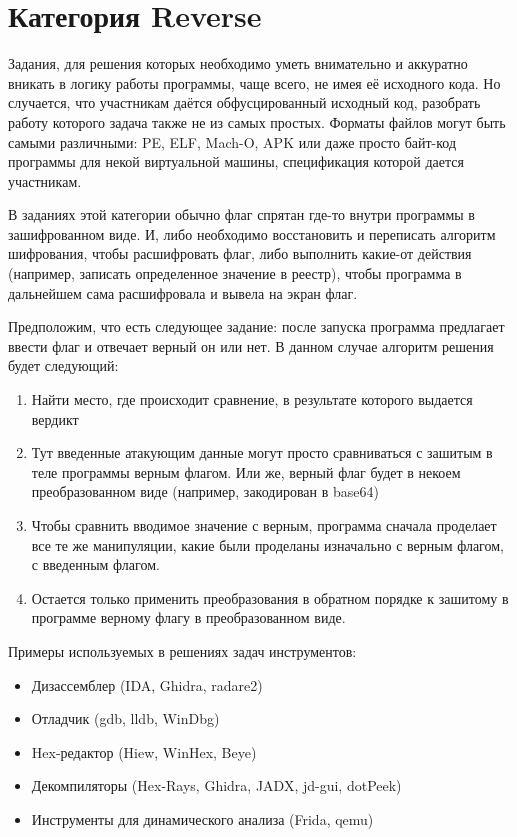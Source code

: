 


\section{Категория Reverse}

Задания, для решения которых необходимо уметь внимательно и аккуратно вникать в логику работы программы, чаще всего, не имея её исходного кода. Но случается, что участникам даётся обфусцированный исходный код, разобрать работу которого задача также не из самых простых. Форматы файлов могут быть самыми различными: PE, ELF, Mach-O, APK или даже просто байт-код программы для некой виртуальной машины, спецификация которой дается участникам.

В заданиях этой категории обычно флаг спрятан где-то внутри программы в зашифрованном виде. И, либо необходимо восстановить и переписать алгоритм шифрования, чтобы расшифровать флаг, либо выполнить какие-от действия (например, записать определенное значение в реестр), чтобы программа в дальнейшем сама расшифровала и вывела на экран флаг.

Предположим, что есть следующее задание: после запуска программа предлагает ввести флаг и отвечает верный он или нет. В данном случае алгоритм решения будет следующий:
\begin{enumerate}
    \item Найти место, где происходит сравнение, в результате которого выдается вердикт
    \item Тут введенные атакующим данные могут просто сравниваться с зашитым в теле программы верным флагом. Или же, верный флаг будет в некоем преобразованном виде (например, закодирован в base64)
    \item Чтобы сравнить вводимое значение с верным, программа сначала проделает все те же манипуляции, какие были проделаны изначально с верным флагом, с введенным флагом.
    \item Остается только применить преобразования в обратном порядке к зашитому в программе верному флагу в преобразованном виде.
\end{enumerate}
Примеры используемых в решениях задач инструментов:
\begin{itemize}
    \item Дизассемблер (IDA, Ghidra, radare2)
    \item Отладчик (gdb, lldb, WinDbg)
    \item Hex-редактор (Hiew, WinHex, Beye)
    \item Декомпиляторы (Hex-Rays, Ghidra, JADX, jd-gui, dotPeek)
    \item Инструменты для динамического анализа (Frida, qemu)
\end{itemize}

